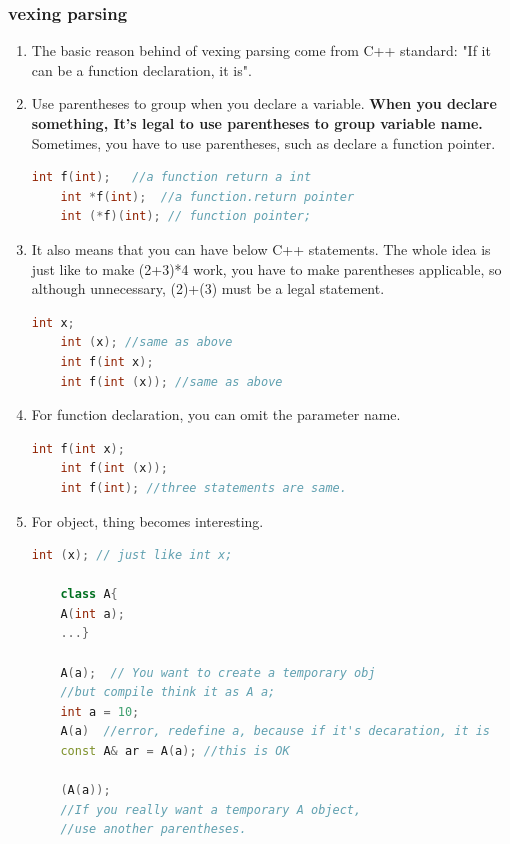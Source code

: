 \documentclass[a4paper,12pt,twoside]{book}
\begin{document}
\subsubsection{vexing parsing}
\begin{enumerate}
	\item The basic reason behind of vexing parsing come from C++ standard: "If it can be a function declaration, it is".
	
	\item Use parentheses to group when you declare a variable. \textbf{When you declare something, It's legal to use parentheses to group variable name.} Sometimes, you have to use parentheses, such as declare a function pointer. 
	\begin{lstlisting}[frame=single, language=c++, mathescape=true]
	int f(int);   //a function return a int
	int *f(int);  //a function.return pointer
	int (*f)(int); // function pointer;  
	\end{lstlisting}
	
	\item It also means that you can have below C++ statements. The whole idea is just like to make (2+3)*4 work, you have to make parentheses applicable, so although unnecessary, (2)+(3) must be a legal statement.
	\begin{lstlisting}[frame=single, language=c++, mathescape=true]
	int x;
	int (x); //same as above
	int f(int x);
	int f(int (x)); //same as above
	\end{lstlisting}
	
	\item For function declaration, you can omit the parameter name.  
	\begin{lstlisting}[frame=single, language=c++, mathescape=true]
	int f(int x);
	int f(int (x));
	int f(int); //three statements are same. 
	\end{lstlisting}
	
	\item For object, thing becomes interesting.
	\begin{lstlisting}[frame=single, language=c++, mathescape=true]
	int (x); // just like int x;
	
	class A{
	A(int a);
	...}
	
	A(a);  // You want to create a temporary obj
	//but compile think it as A a;
	int a = 10;
	A(a)  //error, redefine a, because if it's decaration, it is
	const A& ar = A(a); //this is OK
	
	(A(a)); 
	//If you really want a temporary A object,
	//use another parentheses. 
	\end{lstlisting}
	

\end{enumerate}
\end{document}
